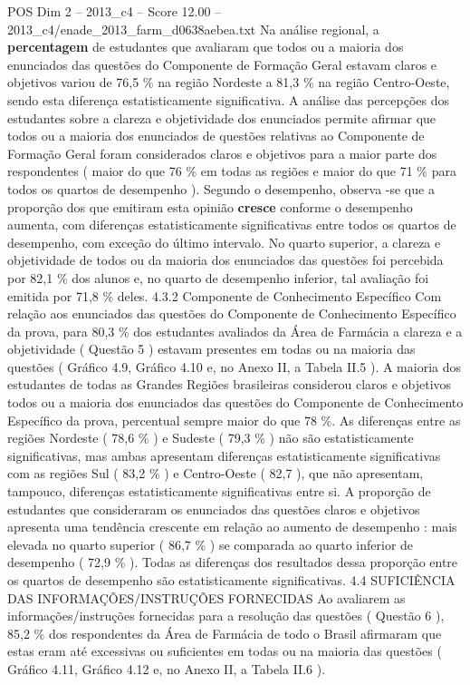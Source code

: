\begin{textsample}{POS Dim 2 – 2013\_c4 – Score 12.00 – 2013\_c4/enade\_2013\_farm\_d0638aebea.txt}
Na análise regional, a \textbf{percentagem} de estudantes que avaliaram que todos ou a maioria dos enunciados das questões do Componente de Formação Geral estavam claros e objetivos variou de 76,5 \% na região Nordeste a 81,3 \% na região Centro-Oeste, sendo esta diferença estatisticamente significativa.
A análise das percepções dos estudantes sobre a clareza e objetividade dos enunciados permite afirmar que todos ou a maioria dos enunciados de questões relativas ao Componente de Formação Geral foram considerados claros e objetivos para a maior parte dos respondentes ( maior do que 76 \% em todas as regiões e maior do que 71 \% para todos os quartos de desempenho ).
Segundo o desempenho, observa -se que a proporção dos que emitiram esta opinião \textbf{cresce} conforme o desempenho aumenta, com diferenças estatisticamente significativas entre todos os quartos de desempenho, com exceção do último intervalo.
No quarto superior, a clareza e objetividade de todos ou da maioria dos enunciados das questões foi percebida por 82,1 \% dos alunos e, no quarto de desempenho inferior, tal avaliação foi emitida por 71,8 \% deles. 4.3.2 Componente de Conhecimento Específico Com relação aos enunciados das questões do Componente de Conhecimento Específico da prova, para 80,3 \% dos estudantes avaliados da Área de Farmácia a clareza e a objetividade ( Questão 5 ) estavam presentes em todas ou na maioria das questões ( Gráfico 4.9, Gráfico 4.10 e, no Anexo II, a Tabela II.5 ).
A maioria dos estudantes de todas as Grandes Regiões brasileiras considerou claros e objetivos todos ou a maioria dos enunciados das questões do Componente de Conhecimento Específico da prova, percentual sempre maior do que 78 \%.
As diferenças entre as regiões Nordeste ( 78,6 \% ) e Sudeste ( 79,3 \% ) não são estatisticamente significativas, mas ambas apresentam diferenças estatisticamente significativas com as regiões Sul ( 83,2 \% ) e Centro-Oeste ( 82,7 ), que não apresentam, tampouco, diferenças estatisticamente significativas entre si.
A proporção de estudantes que consideraram os enunciados das questões claros e objetivos apresenta uma tendência crescente em relação ao aumento de desempenho : mais elevada no quarto superior ( 86,7 \% ) se comparada ao quarto inferior de desempenho ( 72,9 \% ).
Todas as diferenças dos resultados dessa proporção entre os quartos de desempenho são estatisticamente significativas. 4.4 SUFICIÊNCIA DAS INFORMAÇÕES/INSTRUÇÕES FORNECIDAS Ao avaliarem as informações/instruções fornecidas para a resolução das questões ( Questão 6 ), 85,2 \% dos respondentes da Área de Farmácia de todo o Brasil afirmaram que estas eram até excessivas ou suficientes em todas ou na maioria das questões ( Gráfico 4.11, Gráfico 4.12 e, no Anexo II, a Tabela II.6 ).

\end{textsample}
